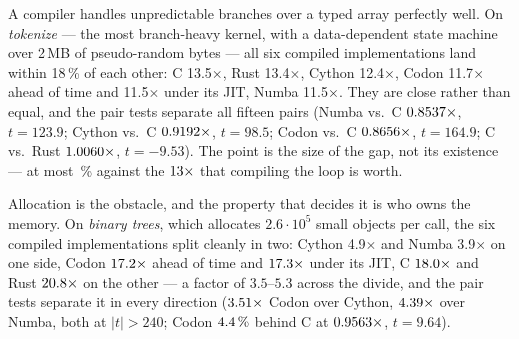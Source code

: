 A compiler handles unpredictable branches over a typed array perfectly well. On \emph{tokenize}
--- the most branch-heavy kernel,
with a data-dependent state machine over 2\,MB of pseudo-random bytes --- all six compiled
implementations land within 18\,\% of each other: C 13.5$\times$, Rust 13.4$\times$, Cython
12.4$\times$, Codon 11.7$\times$ ahead of time and 11.5$\times$ under its JIT, Numba
11.5$\times$. They are close rather than equal, and the pair tests separate all fifteen pairs
(Numba vs.\ C $\meas{ratio:b2_branchy-314:tokenize/c_ctypes|b2_branchy-314:tokenize/numba}{0.8537}\times$, $t=123.9$; Cython vs.\ C $\meas{ratio:b2_branchy-314:tokenize/c_ctypes|b2_branchy-314:tokenize/cython}{0.9192}\times$, $t=98.5$; Codon vs.\ C
$\meas{ratio:b2_branchy-314:tokenize/c_ctypes|b2_branchy-314:tokenize/codon_pyext}{0.8656}\times$, $t=164.9$; C vs.\ Rust $\meas{ratio:b2_branchy-314:tokenize/rust_ctypes|b2_branchy-314:tokenize/c_ctypes}{1.0060}\times$, $t=-9.53$). The point is the size of the
gap, not its existence --- at most \,\% against the $\meas{ratio:b2_branchy-314:tokenize/cpython_loop|b2_branchy-314:tokenize/c_ctypes}{13}\times$ that compiling the loop is
worth.

Allocation is the obstacle, and the property that decides it is who owns the memory. On
\emph{binary trees}, which allocates $2.6\cdot10^5$ small objects per call, the six compiled
implementations split cleanly in two: Cython 4.9$\times$ and Numba 3.9$\times$ on one side,
Codon $\meas{ratio:b2_branchy-314:binarytrees/cpython_loop|b2_branchy-314:binarytrees/codon_pyext}{17.2}\times$ ahead of time and $\meas{ratio:b2_branchy-314:binarytrees/cpython_loop|b2_branchy-314:binarytrees/codon_jit}{17.3}\times$ under its JIT, C $\meas{ratio:b2_branchy-314:binarytrees/cpython_loop|b2_branchy-314:binarytrees/c_ctypes}{18.0}\times$ and Rust
$\meas{ratio:b2_branchy-314:binarytrees/cpython_loop|b2_branchy-314:binarytrees/rust_ctypes}{20.8}\times$ on the other --- a factor of $3.5$--$5.3$ across the divide, and the pair tests
separate it in every direction ($\meas{ratio:b2_branchy-314:binarytrees/cython|b2_branchy-314:binarytrees/codon_pyext}{3.51}\times$ Codon over Cython, $\meas{ratio:b2_branchy-314:binarytrees/numba|b2_branchy-314:binarytrees/codon_pyext}{4.39}\times$ over Numba, both
at $|t| > 240$; Codon $\meas{saving:b2_branchy-314:binarytrees/c_ctypes|b2_branchy-314:binarytrees/codon_pyext}{4.4}\,\%$ behind C at $\meas{ratio:b2_branchy-314:binarytrees/c_ctypes|b2_branchy-314:binarytrees/codon_pyext}{0.9563}\times$, $t=9.64$).

